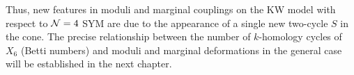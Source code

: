 Thus, new features in moduli and marginal couplings on the KW model with respect to $\mathcal{N}=4$ SYM are due to the appearance of a single new two-cycle $S$ in the cone. The precise relationship between the number of $k$-homology cycles of $X_6$ (Betti numbers) and moduli and marginal deformations in the general case will be established in the next chapter.

%
%
%
%
%
%
